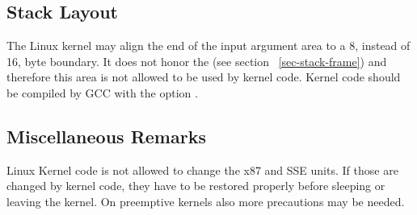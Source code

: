 \subsection{Stack Layout}

The Linux kernel may align the end of the input argument area to a
8, instead of 16, byte boundary.  It does not honor the
 (see section~ \ref{sec-stack-frame}) and therefore
this area is not allowed to be used by kernel code.  Kernel code should
be compiled by GCC with the option .

\subsection{Miscellaneous Remarks}

Linux Kernel code is not allowed to change the x87 and SSE units.  If
those are changed by kernel code, they have to be restored properly
before sleeping or leaving the kernel.  On preemptive kernels also
more precautions may be needed.


